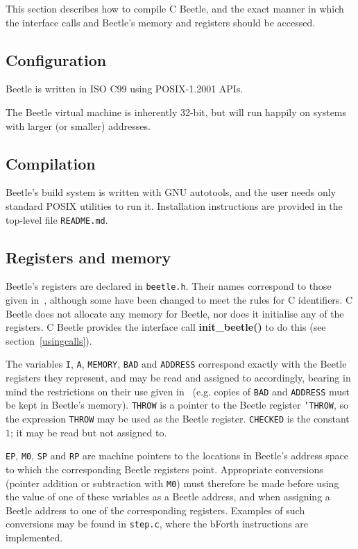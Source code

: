 \documentclass{article}
\begin{document}
This section describes how to compile C Beetle, and the exact manner in which
the interface calls and Beetle's memory and registers should be accessed.


\subsection{Configuration}
\label{configuration}

Beetle is written in ISO C99 using POSIX-1.2001 APIs.

The Beetle virtual machine is inherently 32-bit, but will run happily on systems with larger (or smaller) addresses.


\subsection{Compilation}

Beetle's build system is written with GNU autotools, and the user
needs only standard POSIX utilities to run it. Installation
instructions are provided in the top-level file {\tt README.md}.


\subsection{Registers and memory}

Beetle's registers are declared in {\tt beetle.h}. Their names correspond to
those given in~\cite[section~2.1]{beetle}, although some have been changed
to meet the rules for C identifiers. C Beetle does not allocate any
memory for Beetle, nor does it initialise any of the registers. C Beetle
provides the interface call {\bf init\_beetle()} to do this (see
section~\ref{usingcalls}).

The variables {\tt I}, {\tt A}, {\tt MEMORY}, {\tt BAD} and {\tt ADDRESS}
correspond exactly with the Beetle registers they represent, and may be read
and assigned to accordingly, bearing in mind the restrictions on their use
given in~\cite{beetle} (e.g. copies of {\tt BAD} and {\tt ADDRESS} must be
kept in Beetle's memory). {\tt THROW} is a pointer to the Beetle register
{\tt 'THROW}, so the expression {\tt *THROW} may be used as the Beetle
register. {\tt CHECKED} is the constant $1$; it may be read but not
assigned to.

{\tt EP}, {\tt M0}, {\tt SP} and {\tt RP} are machine pointers to the
locations in Beetle's address space to which the corresponding Beetle
registers point. Appropriate conversions (pointer addition or subtraction
with {\tt M0}) must therefore be made before using the value of one of these
variables as a Beetle address, and when assigning a Beetle address to one of
the corresponding registers. Examples of such conversions may be found in
{\tt step.c}, where the bForth instructions are implemented.
\end{document}
